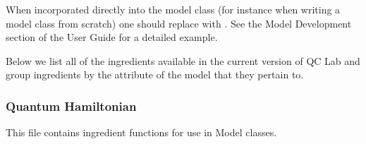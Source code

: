 \documentclass[letterpaper,10pt,english]{sphinxmanual}
\begin{document}
\sphinxAtStartPar
When incorporated directly into the model class (for instance when writing a model class from scratch) one should replace  with . See the Model Development section of the User Guide
for a detailed example.

\sphinxAtStartPar
Below we list all of the ingredients available in the current version of QC Lab and group ingredients by the attribute of the model that they pertain to.


\subsubsection{Quantum Hamiltonian}
\label{\detokenize{software_reference/ingredients/ingredients:module-qc_lab.ingredients}}\label{\detokenize{software_reference/ingredients/ingredients:quantum-hamiltonian}}
\sphinxAtStartPar
This file contains ingredient functions for use in Model classes.
\end{document}
